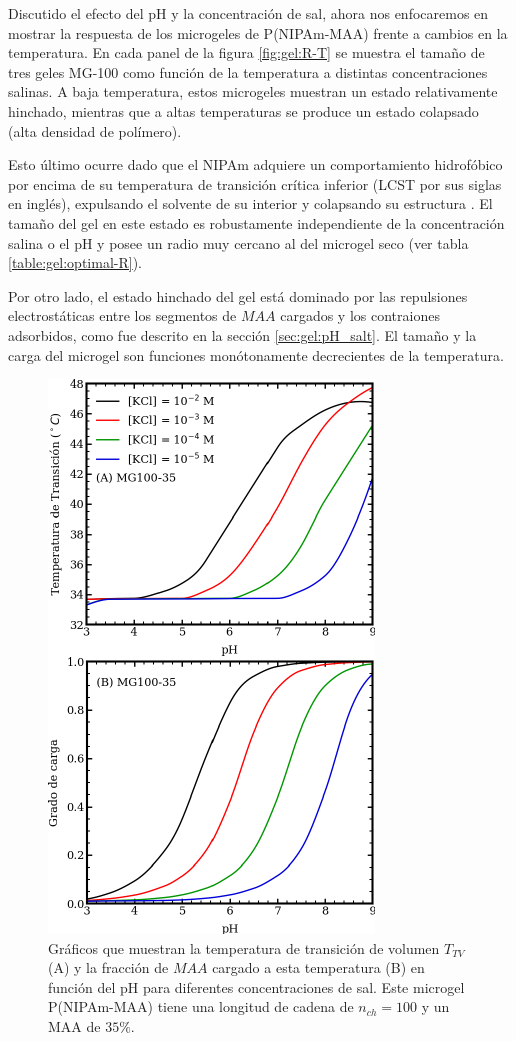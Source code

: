Discutido el efecto del pH y la concentraci\'on de sal, ahora nos enfocaremos en mostrar la respuesta de los microgeles de P(NIPAm-MAA) frente a cambios en la temperatura.
En cada panel de la figura \ref{fig:gel:R-T} se muestra el tama\~no de tres geles MG-100 como funci\'on de la temperatura a distintas concentraciones salinas.
A baja temperatura, estos microgeles muestran un estado relativamente hinchado, mientras que a altas temperaturas se produce un estado colapsado (alta densidad de pol\'imero).

Esto \'ultimo ocurre dado que el NIPAm adquiere un comportamiento hidrof\'obico por encima de su temperatura de transici\'on cr\'itica inferior (LCST por sus siglas en ingl\'es), expulsando el solvente de su interior y colapsando su estructura \cite{sbeih2019structural}.
El tama\~no del gel en este estado es robustamente independiente de la concentraci\'on salina o el pH y posee un radio muy cercano al del microgel seco (ver tabla \ref{table:gel:optimal-R}).

Por otro lado, el estado hinchado del gel est\'a dominado por las repulsiones electrost\'aticas entre los segmentos de $MAA$ cargados y los contraiones adsorbidos, como fue descrito en la secci\'on \ref{sec:gel:pH_salt}.
El tama\~no y la carga del microgel son funciones mon\'otonamente decrecientes de la temperatura.


\begin{figure}[!htb]
	\centering
	\includegraphics[width=0.55\linewidth]{Figures/graph-gel/Tpt-pH.pdf}
	\caption{Gr\'aficos que muestran la temperatura de transici\'on de volumen $T_{TV}$ (A) y la fracci\'on de $MAA$ cargado a esta temperatura (B) en funci\'on del pH para diferentes concentraciones de sal.
		Este microgel P(NIPAm-MAA) tiene una longitud de cadena de $n_{ch}=100$ y un MAA de $35\%$.}
	\label{fig:gel:Tpt-pH}
\end{figure}


